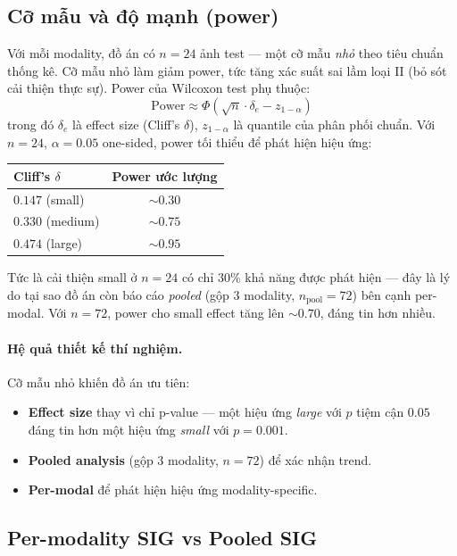 \subsection{Cỡ mẫu và độ mạnh (power)}
\label{ssec:power}

Với mỗi modality, đồ án có $n = 24$ ảnh test --- một cỡ mẫu \emph{nhỏ} theo tiêu chuẩn thống kê. Cỡ mẫu nhỏ làm giảm power, tức tăng xác suất sai lầm loại II (bỏ sót cải thiện thực sự). Power của Wilcoxon test phụ thuộc:
\begin{equation}
\text{Power} \approx \Phi\left(\sqrt{n} \cdot \delta_e - z_{1-\alpha}\right)
\end{equation}
trong đó $\delta_e$ là effect size (Cliff's $\delta$), $z_{1-\alpha}$ là quantile của phân phối chuẩn. Với $n = 24$, $\alpha = 0.05$ one-sided, power tối thiểu để phát hiện hiệu ứng:
\begin{center}
\begin{tabular}{lc}
\toprule
\textbf{Cliff's $\delta$} & \textbf{Power ước lượng} \\
\midrule
$0.147$ (small)  & $\sim 0.30$ \\
$0.330$ (medium) & $\sim 0.75$ \\
$0.474$ (large)  & $\sim 0.95$ \\
\bottomrule
\end{tabular}
\end{center}
Tức là cải thiện small ở $n = 24$ có chỉ $30\%$ khả năng được phát hiện --- đây là lý do tại sao đồ án còn báo cáo \emph{pooled} (gộp 3 modality, $n_{\mathrm{pool}} = 72$) bên cạnh per-modal. Với $n = 72$, power cho small effect tăng lên $\sim 0.70$, đáng tin hơn nhiều.

\paragraph{Hệ quả thiết kế thí nghiệm.}
Cỡ mẫu nhỏ khiến đồ án ưu tiên:
\begin{itemize}\itemsep0pt
    \item \textbf{Effect size} thay vì chỉ p-value --- một hiệu ứng \emph{large} với $p$ tiệm cận $0.05$ đáng tin hơn một hiệu ứng \emph{small} với $p = 0.001$.
    \item \textbf{Pooled analysis} (gộp 3 modality, $n = 72$) để xác nhận trend.
    \item \textbf{Per-modal} để phát hiện hiệu ứng modality-specific.
\end{itemize}

\subsection{Per-modality SIG vs Pooled SIG}
\label{ssec:per-modal-vs-pooled}

